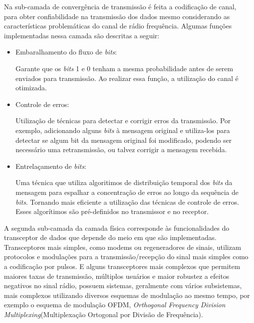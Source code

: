 Na sub-camada de convergência de transmissão é feita a codificação de canal, para obter confiabilidade na transmissão dos dados mesmo considerando as características problemáticas do canal de rádio frequência. Algumas funções implementadas nessa camada são descritas a seguir:
\begin{itemize}
	\item Embaralhamento do fluxo de \emph{bits}:

	      Garante que os \emph{bits} 1 e 0 tenham a mesma probabilidade antes de serem enviados para transmissão. Ao realizar essa função, a utilização do canal é otimizada.
	\item Controle de erros:

	      Utilização de técnicas para detectar e corrigir erros da transmissão. Por exemplo, adicionando alguns \emph{bits} à mensagem original e utiliza-los para detectar se algum bit da mensagem original foi modificado, podendo ser necessário uma retransmissão, ou talvez corrigir a mensagem recebida.
	\item Entrelaçamento de \emph{bits}:

	      Uma técnica que utiliza algoritimos de distribuição temporal dos \emph{bits} da mensagem para espalhar a concentração de erros ao longo da sequência de \emph{bits}. Tornando mais eficiente a utilização das técnicas de controle de erros. Esses algorítimos são pré-definidos no transmissor e no receptor.
\end{itemize}

A segunda sub-camada da camada física corresponde às funcionalidades do transceptor de dados que depende do meio em que são implementadas. Transceptores mais simples, como modems ou regeneradores de sinais, utilizam protocolos e modulações para a transmissão/recepção do sinal mais simples como a codificação por pulsos. E alguns transceptores mais complexos que permitem maiores taxas de transmissão, múltiplos usuários e maior robustez a efeitos negativos no sinal rádio, possuem sistemas, geralmente com vários subsistemas, mais complexos utilizando diversos esquemas de modulação ao mesmo tempo, por exemplo o esquema de modulação OFDM, \emph{Orthogonal Frequency Division Multiplexing}(Multiplexação Ortogonal por Divisão de Frequência).


